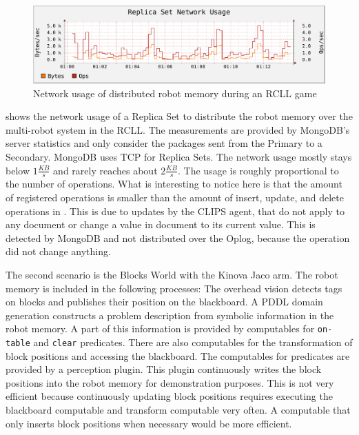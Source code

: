 \begin{figure}
  \centering
  \includegraphics[width=\textwidth]{plots/rsnetwork}
  \caption[Network usage of distributed robot memory during an RCLL game]{Network usage of distributed robot memory during an RCLL game}
  \label{fig:rcll-network}
\end{figure}
 shows the network usage of a Replica Set to
distribute the robot memory over the multi-robot system in the
RCLL. The measurements are provided by MongoDB's server statistics and
only consider the packages sent from the Primary to a
Secondary. MongoDB uses TCP for Replica Sets. The
network usage mostly stays below $1\frac{KB}{s}$ and rarely
reaches about $2\frac{KB}{s}$. The usage is roughly proportional to
the number of operations. What is interesting to notice here is that
the amount of registered operations is smaller than the amount of
insert, update, and delete operations in . This
is due to updates by the CLIPS agent, that do not apply to any
document or change a value in document to its current value. This is
detected by MongoDB and not distributed over the Oplog, because the
operation did not change anything.

The second scenario is the Blocks World with the Kinova Jaco arm. The
robot memory is included in the following processes: The overhead
vision detects tags on blocks and publishes their position on the
blackboard. A PDDL domain generation constructs a problem description
from symbolic information in the robot memory. A part of this
information is provided by computables for \texttt{on-table} and
\texttt{clear} predicates. There are also computables for the
transformation of block positions and accessing the blackboard. The
computables for predicates are provided by a perception plugin. This
plugin continuously writes the block positions into the robot memory
for demonstration purposes. This is not very efficient because
continuously updating block positions requires executing the
blackboard computable and transform computable very often. A
computable that only inserts block positions when necessary would be
more efficient.

